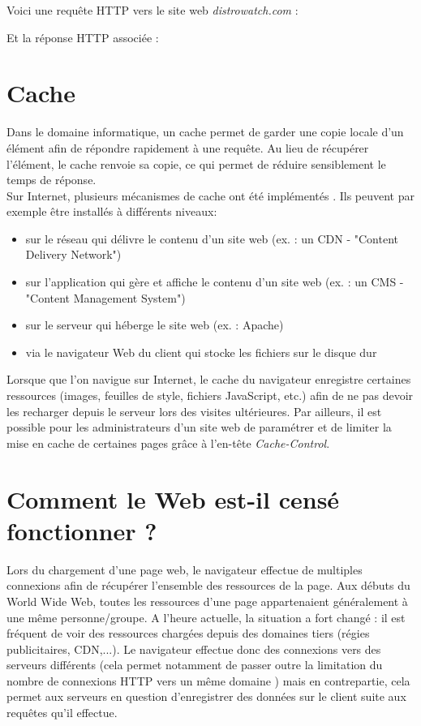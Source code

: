 Voici une requête HTTP vers le site web \textit{distrowatch.com} :


Et la réponse HTTP associée :


\section{Cache}
\label{cache-expl}
Dans le domaine informatique, un cache permet de garder une copie locale d'un élément afin de répondre rapidement à une requête. Au lieu de récupérer l'élément, le cache renvoie sa copie, ce qui permet de réduire sensiblement le temps de réponse.\\
Sur Internet, plusieurs mécanismes de cache ont été implémentés \cite{WikipediaEN_Web_cache}. Ils peuvent par exemple être installés à différents niveaux:

\begin{itemize}
  \item sur le réseau qui délivre le contenu d'un site web (ex. : un CDN - "Content Delivery Network")
  \item sur l'application qui gère et affiche le contenu d'un site web (ex. : un CMS - "Content Management System")
  \item sur le serveur qui héberge le site web (ex. : Apache)
  \item via le navigateur Web du client qui stocke les fichiers sur le disque dur
  \newline
\end{itemize}

Lorsque que l'on navigue sur Internet, le cache du navigateur enregistre certaines ressources (images, feuilles de style, fichiers JavaScript, etc.) afin de ne pas devoir les recharger depuis le serveur lors des visites ultérieures. Par ailleurs, il est possible pour les administrateurs d'un site web de paramétrer et de limiter la mise en cache de certaines pages grâce à l'en-tête \textit{Cache-Control}.


\section{Comment le Web est-il censé fonctionner ?}
\label{web-expl}
Lors du chargement d'une page web, le navigateur effectue de multiples connexions afin de récupérer l'ensemble des ressources de la page. Aux débuts du World Wide Web, toutes les ressources d'une page appartenaient généralement à une même personne/groupe. A l'heure actuelle, la situation a fort changé : il est fréquent de voir des ressources chargées depuis des domaines tiers (régies publicitaires, CDN,...). Le navigateur effectue donc des connexions vers des serveurs différents (cela permet notamment de passer outre la limitation du nombre de connexions HTTP vers un même domaine \cite{IETF_RFC2616}) mais en contrepartie, cela permet aux serveurs en question d'enregistrer des données sur le client suite aux requêtes qu'il effectue.
\newline

